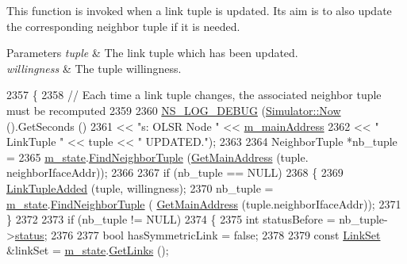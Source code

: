 This function is invoked when a link tuple is updated. Its aim is to also update the corresponding neighbor tuple if it is needed. 


\begin{DoxyParams}{Parameters}
{\em tuple} & The link tuple which has been updated. \\
\hline
{\em willingness} & The tuple willingness. \\
\hline
\end{DoxyParams}

\begin{DoxyCode}
2357 \{
2358   \textcolor{comment}{// Each time a link tuple changes, the associated neighbor tuple must be recomputed}
2359 
2360   \hyperlink{group__logging_ga413f1886406d49f59a6a0a89b77b4d0a}{NS\_LOG\_DEBUG} (\hyperlink{classns3_1_1Simulator_ac3178fa975b419f7875e7105be122800}{Simulator::Now} ().GetSeconds ()
2361                 << \textcolor{stringliteral}{"s: OLSR Node "} << \hyperlink{classns3_1_1olsr_1_1RoutingProtocol_a58cc50ed5d1039aab603e90e318aabfb}{m\_mainAddress}
2362                 << \textcolor{stringliteral}{" LinkTuple "} << tuple << \textcolor{stringliteral}{" UPDATED."});
2363 
2364   NeighborTuple *nb\_tuple =
2365     \hyperlink{classns3_1_1olsr_1_1RoutingProtocol_a07942ec1a7df71b609c8d2ff3b567c49}{m\_state}.\hyperlink{classns3_1_1olsr_1_1OlsrState_ae116327f63bf588f61e55c7e3f905787}{FindNeighborTuple} (\hyperlink{classns3_1_1olsr_1_1RoutingProtocol_ae01451170fb389d322b33ed6d954f460}{GetMainAddress} (tuple.
      neighborIfaceAddr));
2366 
2367   \textcolor{keywordflow}{if} (nb\_tuple == NULL)
2368     \{
2369       \hyperlink{classns3_1_1olsr_1_1RoutingProtocol_a49feb372260a7d855e02c789e584d5db}{LinkTupleAdded} (tuple, willingness);
2370       nb\_tuple = \hyperlink{classns3_1_1olsr_1_1RoutingProtocol_a07942ec1a7df71b609c8d2ff3b567c49}{m\_state}.\hyperlink{classns3_1_1olsr_1_1OlsrState_ae116327f63bf588f61e55c7e3f905787}{FindNeighborTuple} (
      \hyperlink{classns3_1_1olsr_1_1RoutingProtocol_ae01451170fb389d322b33ed6d954f460}{GetMainAddress} (tuple.neighborIfaceAddr));
2371     \}
2372 
2373   \textcolor{keywordflow}{if} (nb\_tuple != NULL)
2374     \{
2375       \textcolor{keywordtype}{int} statusBefore = nb\_tuple->\hyperlink{structns3_1_1olsr_1_1NeighborTuple_a893b70912d3bd7b437b493e4cb09f738}{status};
2376 
2377       \textcolor{keywordtype}{bool} hasSymmetricLink = \textcolor{keyword}{false};
2378 
2379       \textcolor{keyword}{const} \hyperlink{namespacens3_1_1olsr_a60381cc41d65a2e0daabd286077a378a}{LinkSet} &linkSet = \hyperlink{classns3_1_1olsr_1_1RoutingProtocol_a07942ec1a7df71b609c8d2ff3b567c49}{m\_state}.\hyperlink{classns3_1_1olsr_1_1OlsrState_a1d8f1a95165973f05e3fd1ff0d76fbda}{GetLinks} ();

\end{DoxyCode}
